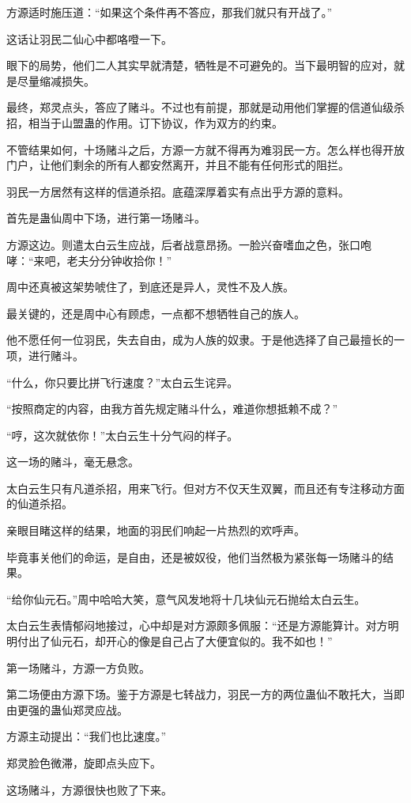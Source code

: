 \begin{this_body}
方源适时施压道：“如果这个条件再不答应，那我们就只有开战了。”

这话让羽民二仙心中都咯噔一下。

眼下的局势，他们二人其实早就清楚，牺牲是不可避免的。当下最明智的应对，就是尽量缩减损失。

最终，郑灵点头，答应了赌斗。不过也有前提，那就是动用他们掌握的信道仙级杀招，相当于山盟蛊的作用。订下协议，作为双方的约束。

不管结果如何，十场赌斗之后，方源一方就不得再为难羽民一方。怎么样也得开放门户，让他们剩余的所有人都安然离开，并且不能有任何形式的阻拦。

羽民一方居然有这样的信道杀招。底蕴深厚着实有点出乎方源的意料。

首先是蛊仙周中下场，进行第一场赌斗。

方源这边。则遣太白云生应战，后者战意昂扬。一脸兴奋嗜血之色，张口咆哮：“来吧，老夫分分钟收拾你！”

周中还真被这架势唬住了，到底还是异人，灵性不及人族。

最关键的，还是周中心有顾虑，一点都不想牺牲自己的族人。

他不愿任何一位羽民，失去自由，成为人族的奴隶。于是他选择了自己最擅长的一项，进行赌斗。

“什么，你只要比拼飞行速度？”太白云生诧异。

“按照商定的内容，由我方首先规定赌斗什么，难道你想抵赖不成？”

“哼，这次就依你！”太白云生十分气闷的样子。

这一场的赌斗，毫无悬念。

太白云生只有凡道杀招，用来飞行。但对方不仅天生双翼，而且还有专注移动方面的仙道杀招。

亲眼目睹这样的结果，地面的羽民们响起一片热烈的欢呼声。

毕竟事关他们的命运，是自由，还是被奴役，他们当然极为紧张每一场赌斗的结果。

“给你仙元石。”周中哈哈大笑，意气风发地将十几块仙元石抛给太白云生。

太白云生表情郁闷地接过，心中却是对方源颇多佩服：“还是方源能算计。对方明明付出了仙元石，却开心的像是自己占了大便宜似的。我不如也！”

第一场赌斗，方源一方负败。

第二场便由方源下场。鉴于方源是七转战力，羽民一方的两位蛊仙不敢托大，当即由更强的蛊仙郑灵应战。

方源主动提出：“我们也比速度。”

郑灵脸色微滞，旋即点头应下。

这场赌斗，方源很快也败了下来。


\end{this_body}
